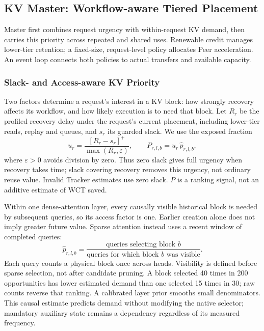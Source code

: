 \subsection{KV Master: Workflow-aware Tiered Placement}
\label{sec:kv-master}

Master first combines request urgency with within-request KV demand,
then carries this priority across repeated and shared uses. Renewable
credit manages lower-tier retention; a fixed-size, request-level policy
allocates Peer acceleration. An event loop connects both policies to
actual transfers and available capacity.

\subsubsection{Slack- and Access-aware KV Priority}
\label{sec:placement-value}
\label{sec:prefix-value}

Two factors determine a request's interest in a KV block:
how strongly recovery affects its workflow, and how likely execution is
to need that block. Let $R_r$ be the profiled recovery delay under the
request's current placement, including lower-tier reads, replay and
queues, and $s_r$ its guarded slack. We use the exposed fraction
\begin{equation}
 u_r=\frac{[R_r-s_r]^+}{\max(R_r,\varepsilon)},
 \qquad P_{r,l,b}=u_r\,\widehat p_{r,l,b},
 \label{eq:value}
\end{equation}
where $\varepsilon>0$ avoids division by zero. Thus zero slack gives full
urgency when recovery takes time; slack covering recovery removes this
urgency, not ordinary reuse value. Invalid Tracker estimates use zero
slack. $P$ is a ranking signal, not an additive estimate of WCT saved.

Within one dense-attention layer, every causally visible historical block
is needed by subsequent queries, so its access factor is one. Earlier
creation alone does not imply greater future value. Sparse attention
instead uses a recent window of completed queries:
\begin{equation}
 \widehat p_{r,l,b}=
 \frac{\text{queries selecting block }b}
      {\text{queries for which block }b\text{ was visible}}.
 \label{eq:selection-probability}
\end{equation}
Each query counts a physical block once across heads. Visibility is
defined before sparse selection, not after candidate pruning. A block
selected 40 times in 200 opportunities has lower estimated demand than
one selected 15 times in 30; raw counts reverse that ranking. A calibrated
layer prior smooths small denominators. This causal estimate predicts
demand without modifying the native selector; mandatory auxiliary state
remains a dependency regardless of its measured frequency.

